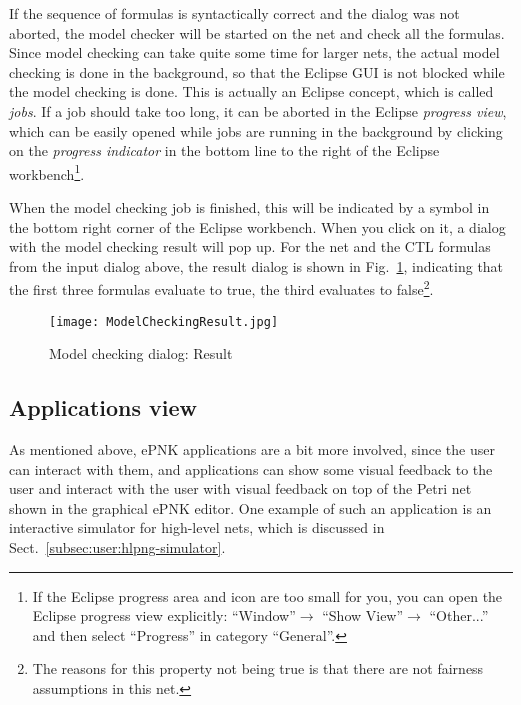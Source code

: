 If the sequence of formulas is syntactically correct and the dialog was not
aborted, the model checker will be started on the net and check all the
formulas. Since model
checking can take quite some time for larger nets, the actual model checking
is done in the background, so that the Eclipse GUI is not blocked while
the model checking is done.  This is actually an Eclipse concept, which
is called \emph{jobs}. %
If a job should take too long, it can be aborted in the Eclipse
\emph{progress view},%
which can be easily opened while jobs are running in the background by clicking
on the \emph{progress indicator}%
in the bottom line to the right of the Eclipse workbench\footnote
 {If the Eclipse progress area and icon are too small for you, you can
  open the Eclipse progress view explicitly: ``Window''$\rightarrow$ ``Show
  View''$\rightarrow$ ``Other...'' and then select ``Progress'' in category
  ``General''.}.

When the model checking job is finished, this will be indicated by a
symbol in the bottom right corner of the Eclipse workbench. When you click
on it, a dialog with the model checking result will pop up. For the
net and the CTL formulas from the input dialog above, the result dialog is
shown in Fig.~\ref{fig:user:modelchecker-result}, indicating that the
first three formulas evaluate to true, the third evaluates to false\footnote
  {The reasons for this property not being true is that there are not
   fairness assumptions in this net.}.%
%
\begin{figure}[hbt!!]
  \centerline{\texttt{[image: ModelCheckingResult.jpg]}}
  \caption{Model checking dialog: Result}
  \label{fig:user:modelchecker-result}
\end{figure}


\subsection{Applications view}
\label{subsec:user:applications-view}

As mentioned above, ePNK applications are a bit more involved, since the
user can interact with them, and applications can show some visual feedback
to the user and interact with the user with visual feedback on top
of the Petri net shown in the graphical ePNK editor. One example of such
an application is an interactive simulator for high-level nets, which
is discussed in Sect.~\ref{subsec:user:hlpng-simulator}.

